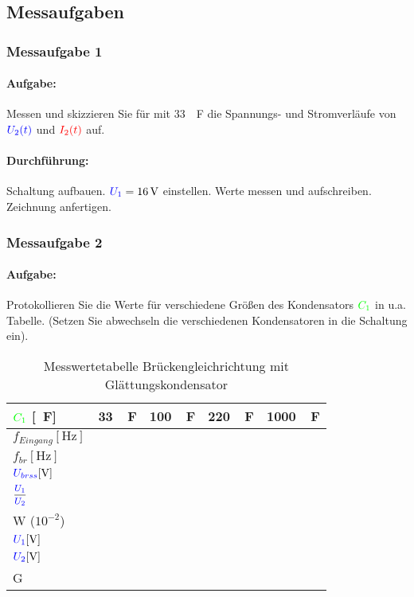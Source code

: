 \documentclass[11pt,a4paper,titlepage]{scrreprt}
\begin{document}
			\subsection{Messaufgaben}
			\subsubsection{Messaufgabe 1}
			\paragraph{Aufgabe:}   Messen und skizzieren Sie für  mit \SI{33}{\mu\farad} die Spannungs- und Stromverläufe von $\textcolor{blue}{U_2(t)}$ und $\textcolor{red}{I_2(t)}$ auf.
			\paragraph{Durchführung:}  Schaltung aufbauen. $\textcolor{blue}{U_1} = \SI{16}{\volt}$ einstellen. Werte messen und aufschreiben. Zeichnung anfertigen.

			\subsubsection{Messaufgabe 2}
			\paragraph{Aufgabe:}  Protokollieren Sie die Werte für verschiedene Größen des Kondensators $\textcolor{green}{C_1}$ in u.a. Tabelle. (Setzen Sie abwechseln die verschiedenen Kondensatoren in die Schaltung ein). 
            
    			\begin{table}[!hbtp]
    				\caption{Messwertetabelle Brückengleichrichtung mit Glättungskondensator}
    				\label{tbl:messergebnisse2.2}
    				\renewcommand{\arraystretch}{1.3}
                    \begin{center}
    				\begin{tabular}{l|c|c|c|c}
    					$\textcolor{green}{C_1}$ [\si{\mu\farad}] & \SI{33}{\mu\farad} &\SI{100}{\mu\farad} &\SI{220}{\mu\farad} &\SI{1000}{\mu\farad}\\ \hline
    					$f_{Eingang} [\si{\hertz}]$  &  &  &  & \\
    					$f_{br} [\si{\hertz}]$ &  &  &  & \\
    					$\textcolor{blue}{U_{brss}} [\si{\volt}]$ &  &  &  &   \\\hline
    					$\mfrac{\spannung{U_1}}{\spannung{U_2}}$ &  &  &  & \\
    					W ($10^{-2}$) & &  &  &  \\
    					$\textcolor{blue}{U_1} [\si{\volt}]$ &  &  &  & \\
                        $\textcolor{blue}{U_2} [\si{\volt}]$ &  &  &  & \\
                        G &	 &  &  & 
    				\end{tabular}
                \end{center}
    			\end{table}
            
\end{document}
